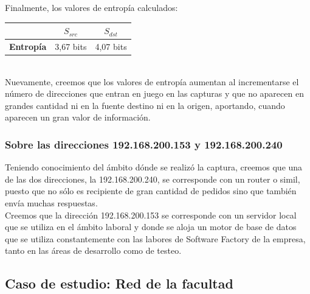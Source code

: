 \indent Finalmente, los valores de entropía calculados:\\

\begin{centering}
	\begin{tabular}{ | c | c | c |} \hline
	   & \textbf{$S_{src}$} & \textbf{$S_{dst}$} \\ \hline
	  	\textbf{Entropía} & 3,67 bits & 4,07 bits \\ \hline
	\end{tabular}
\end{centering}\\

\indent Nuevamente, creemos que los valores de entropía aumentan al incrementarse el número de direcciones que entran en juego en las capturas y que no aparecen en grandes cantidad ni en la fuente destino ni en la origen, aportando, cuando aparecen un gran valor de información.\\


\subsubsection{Sobre las direcciones 192.168.200.153 y 192.168.200.240}

\indent Teniendo conocimiento del ámbito dónde se realizó la captura, creemos que una de las dos direcciones, la 192.168.200.240, se corresponde con un router o simil, puesto que no sólo es recipiente de gran cantidad de pedidos sino que también envía muchas respuestas.\\
\indent Creemos que la dirección 192.168.200.153 se corresponde con un servidor local que se utiliza en el ámbito laboral y donde se aloja un motor de base de datos que se utiliza constantemente con las labores de Software Factory de la empresa, tanto en las áreas de desarrollo como de testeo.\\

\subsection{Caso de estudio: Red de la facultad}

